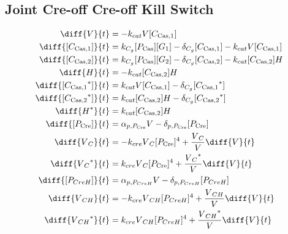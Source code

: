 \subsection{Joint Cre-off Cre-off Kill Switch}
\label{s:Joint_Cre_off_Cre_off_Kill_Switch}

\begin{align}
\diff{\vectorGen{}}{t} & = - \casCutRate{{}}\vectorGen{}\conc{\cplx{\cas}{1}}\\
\diff{\conc{\cplx{\cas}{1}}}{t} & =  \gRnaBind{}\conc{\proSp{\cas{}}}\conc{\gRna{1}} - \casCompDegradeRate{}\conc{\cplx{\cas}{1}} - \casCutRate{{}}\vectorGen{}\conc{\cplx{\cas}{1}}\\
\diff{\conc{\cplx{\cas}{2}}}{t} & =  \gRnaBind{}\conc{\proSp{\cas{}}}\conc{\gRna{2}} - \casCompDegradeRate{}\conc{\cplx{\cas}{2}} - \casCutRate{{}}\conc{\cplx{\cas}{2}}\hostGen{}\\
\diff{\hostGen{}}{t} & = - \casCutRate{{}}\conc{\cplx{\cas}{2}}\hostGen{}\\
\diff{\conc{\bound{\cplx{\cas}{1}}}}{t} & =  \casCutRate{{}}\vectorGen{}\conc{\cplx{\cas}{1}} - \casCompDegradeRate{}\conc{\bound{\cplx{\cas}{1}}}\\
\diff{\conc{\bound{\cplx{\cas}{2}}}}{t} & =  \casCutRate{{}}\conc{\cplx{\cas}{2}}\hostGen{} - \casCompDegradeRate{}\conc{\bound{\cplx{\cas}{2}}}\\
\diff{\edited{\hostGen{}}}{t} & =  \casCutRate{{}}\conc{\cplx{\cas}{2}}\hostGen{}\\
\diff{\conc{\proSp{\cre{}}}}{t} & =  \txtlRate{\proSp{\cre{}}}\vectorGen{} - \proDegradeRate{\proSp{\cre{}}}\conc{\proSp{\cre{}}}\\
\diff{\vectorGen{}_C}{t} & = - \creCutRate{} \vectorGen{}_C \conc{\proSp{\cre{}}}^4 + \frac{\vectorGen{}_C}{\vectorGen{}} \diff{\vectorGen{}}{t}\\
\diff{\edited{\vectorGen{}_C}}{t} & =  \creCutRate{} \vectorGen{}_C \conc{\proSp{\cre{}}}^4 + \frac{\edited{\vectorGen{}_C}}{\vectorGen{}} \diff{\vectorGen{}}{t}\\
\diff{\conc{\proSp{CreH}}}{t} & =  \txtlRate{\proSp{CreH}}\vectorGen{} - \proDegradeRate{\proSp{CreH}}\conc{\proSp{CreH}}\\
\diff{\vectorGen{}_{CH}}{t} & = - \creCutRate{} \vectorGen{}_{CH} \conc{\proSp{CreH}}^4 + \frac{\vectorGen{}_{CH}}{\vectorGen{}} \diff{\vectorGen{}}{t}\\
\diff{\edited{\vectorGen{}_{CH}}}{t} & =  \creCutRate{} \vectorGen{}_{CH} \conc{\proSp{CreH}}^4 + \frac{\edited{\vectorGen{}_{CH}}}{\vectorGen{}} \diff{\vectorGen{}}{t}\\

\end{align}
